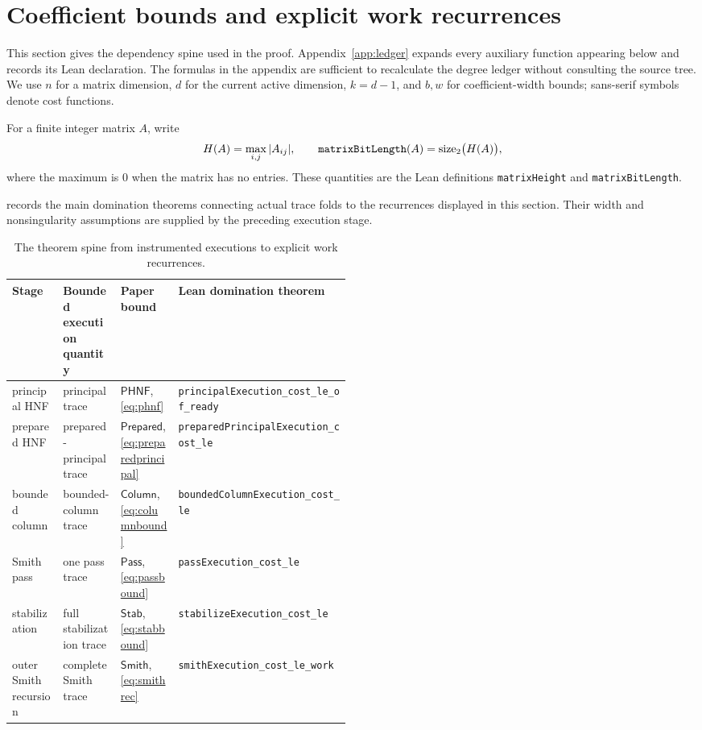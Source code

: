 \documentclass[11pt]{article}
\theoremstyle{definition}
\newcommand{\natsize}{\operatorname{size}_2}
\newcommand{\decl}[1]{\nolinkurl{#1}}
\newcommand{\mcode}[1]{\text{\ttfamily\detokenize{#1}}}
\begin{document}
\section{Coefficient bounds and explicit work recurrences}
\label{sec:bounds}

This section gives the dependency spine used in the proof.  Appendix~\ref{app:ledger} expands every auxiliary function appearing below and records its Lean declaration.  The formulas in the appendix are sufficient to recalculate the degree ledger without consulting the source tree.  We use $n$ for a matrix dimension, $d$ for the current active dimension, $k=d-1$, and $b,w$ for coefficient-width bounds; sans-serif symbols denote cost functions.

For a finite integer matrix $A$, write
\begin{equation}
 H(A)=\max_{i,j}|A_{ij}|,
 \qquad
 \mcode{matrixBitLength}(A)=\natsize\bigl(H(A)\bigr),
 \label{eq:matrixheightwidth}
\end{equation}
where the maximum is $0$ when the matrix has no entries.  These quantities are the Lean definitions \decl{matrixHeight} and \decl{matrixBitLength}.

 records the main domination theorems connecting actual trace folds to the recurrences displayed in this section.  Their width and nonsingularity assumptions are supplied by the preceding execution stage.

\begin{table}[ht]
\centering
\scriptsize
\begin{tabularx}{\linewidth}{@{}p{0.15\linewidth}p{0.17\linewidth}p{0.17\linewidth}X@{}}
\toprule
Stage & Bounded execution quantity & Paper bound & Lean domination theorem \\
\midrule
principal HNF & principal trace & $\mathsf{PHNF}$, \eqref{eq:phnf} & \decl{principalExecution_cost_le_of_ready} \\
prepared HNF & prepared-principal trace & $\mathsf{Prepared}$, \eqref{eq:preparedprincipal} & \decl{preparedPrincipalExecution_cost_le} \\
bounded column & bounded-column trace & $\mathsf{Column}$, \eqref{eq:columnbound} & \decl{boundedColumnExecution_cost_le} \\
Smith pass & one pass trace & $\mathsf{Pass}$, \eqref{eq:passbound} & \decl{passExecution_cost_le} \\
stabilization & full stabilization trace & $\mathsf{Stab}$, \eqref{eq:stabbound} & \decl{stabilizeExecution_cost_le} \\
outer Smith recursion & complete Smith trace & $\mathsf{Smith}$, \eqref{eq:smithrec} & \decl{smithExecution_cost_le_work} \\
\bottomrule
\end{tabularx}
\caption{The theorem spine from instrumented executions to explicit work recurrences.}
\label{tab:boundspine}
\end{table}
\end{document}
